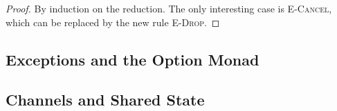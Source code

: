 \documentclass[sigplan,screen,review]{acmart}
\begin{document}
\begin{proof}
  By induction on the reduction. The only interesting case is \textsc{E-Cancel}, which can be replaced by the new rule \textsc{E-Drop}.
\end{proof}

\subsection{Exceptions and the Option Monad}

\subsection{Channels and Shared State}
\end{document}
